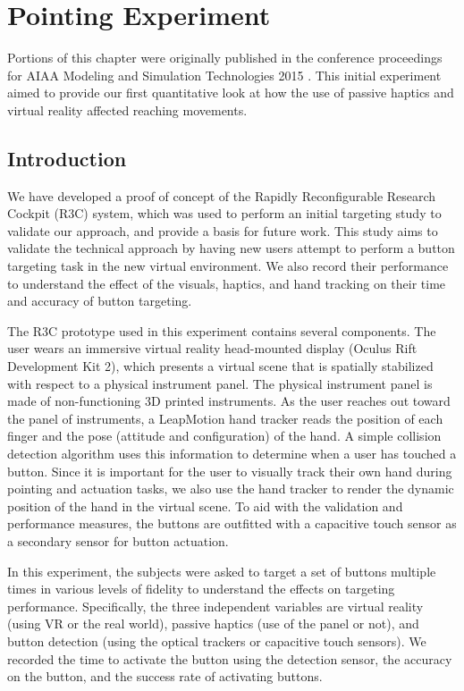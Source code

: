 \chapter{Pointing Experiment}
\label{chap:pointing}

Portions of this chapter were originally published in the conference proceedings for AIAA Modeling and Simulation Technologies 2015 \citep{joyce_rapidly_2015}.
This initial experiment aimed to provide our first quantitative look at how the use of passive haptics and virtual reality affected reaching movements.

\section{Introduction}

We have developed a proof of concept of the Rapidly Reconfigurable Research Cockpit (R3C) system, which was used to perform an initial targeting study to validate our approach, and provide a basis for future work.
This study aims to validate the technical approach by having new users attempt to perform a button targeting task in the new virtual environment.
We also record their performance to understand the effect of the visuals, haptics, and hand tracking on their time and accuracy of button targeting.

The R3C prototype used in this experiment contains several components.
The user wears an immersive virtual reality head-mounted display (Oculus Rift Development Kit 2), which presents a virtual scene that is spatially stabilized with respect to a physical instrument panel.
The physical instrument panel is made of non-functioning 3D printed instruments.
As the user reaches out toward the panel of instruments, a LeapMotion hand tracker reads the position of each finger and the pose (attitude and configuration) of the hand.
A simple collision detection algorithm uses this information to determine when a user has touched a button.
Since it is important for the user to visually track their own hand during pointing and actuation tasks, we also use the hand tracker to render the dynamic position of the hand in the virtual scene.
To aid with the validation and performance measures, the buttons are outfitted with a capacitive touch sensor as a secondary sensor for button actuation.

In this experiment, the subjects were asked to target a set of buttons multiple times in various levels of fidelity to understand the effects on targeting performance.
Specifically, the three independent variables are virtual reality (using VR or the real world), passive haptics (use of the panel or not), and button detection (using the optical trackers or capacitive touch sensors).
We recorded the time to activate the button using the detection sensor, the accuracy on the button, and the success rate of activating buttons.

